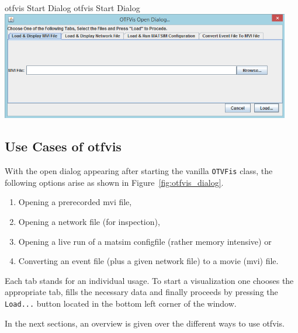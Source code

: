 \createfigure%
{\gls{otfvis} Start Dialog}%
{\gls{otfvis} Start Dialog}%
{\label{fig:otfvis_dialog}}%
{\includegraphics[width=0.95\textwidth, angle=0]{extending/figures/otfvis/image03.png}}%
{}

\subsection{Use Cases of \gls{otfvis}}
With the open dialog appearing after starting the vanilla \lstinline|OTVFis| class, the following options arise as shown in Figure~\ref{fig:otfvis_dialog}.
%
\begin{enumerate}\styleEnumerate
	\item Opening a prerecorded \gls{mvi} file,
	\item Opening a network file (for inspection),
	\item Opening a live run of a \gls{matsim} \gls{configfile} (rather memory intensive) or
	\item Converting an event file (plus a given network file) to a movie (\gls{mvi}) file.
\end{enumerate}

Each tab stands for an individual usage. To start a visualization one chooses the appropriate tab, fills the necessary data and finally proceeds by pressing the \lstinline|Load...| button located in the bottom left corner of the window.

In the next sections, an overview is given over the different ways to use \gls{otfvis}.

